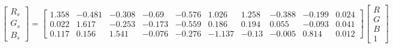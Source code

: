 \begin{equation}
\begin{bmatrix}
  R_s \\ G_s \\ B_s 
\end{bmatrix}=
\left[\begin{matrix}1.358 & -0.481 & -0.308 & -0.69 & -0.576 & 1.026 & 1.258 & -0.388 & -0.199 & 0.024\\ 
0.022 & 1.617 & -0.253 & -0.173 & -0.559 & 0.186 & 0.194 & 0.055 & -0.093 & 0.041\\ 
0.117 & 0.156 & 1.541 & -0.076 & -0.276 & -1.137 & -0.13 & -0.005 & 0.814 & 0.012\end{matrix}\right]
\begin{bmatrix}
  R \\ G \\ B \\ 1 
\end{bmatrix}
\end{equation}
